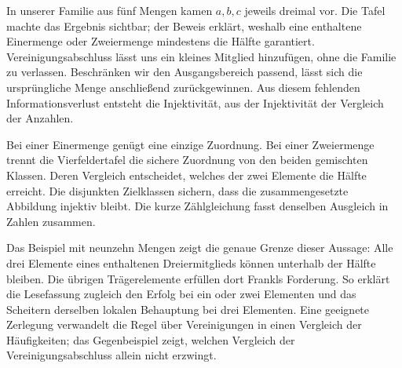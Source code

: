 In unserer Familie aus fünf Mengen kamen \(a,b,c\) jeweils
dreimal vor. Die Tafel machte das Ergebnis sichtbar;
der Beweis erklärt, weshalb eine enthaltene Einermenge
oder Zweiermenge mindestens die Hälfte garantiert.
Vereinigungsabschluss lässt uns ein kleines Mitglied
hinzufügen, ohne die Familie zu verlassen. Beschränken
wir den Ausgangsbereich passend, lässt sich die ursprüngliche
Menge anschließend zurückgewinnen. Aus diesem fehlenden
Informationsverlust entsteht die Injektivität, aus der
Injektivität der Vergleich der Anzahlen.

Bei einer Einermenge genügt eine einzige Zuordnung. Bei
einer Zweiermenge trennt die Vierfeldertafel die sichere
Zuordnung von den beiden gemischten Klassen. Deren Vergleich
entscheidet, welches der zwei Elemente die Hälfte erreicht.
Die disjunkten Zielklassen sichern, dass die zusammengesetzte
Abbildung injektiv bleibt. Die kurze Zählgleichung fasst
denselben Ausgleich in Zahlen zusammen.

Das Beispiel mit neunzehn Mengen zeigt die genaue Grenze
dieser Aussage: Alle drei Elemente eines enthaltenen
Dreiermitglieds können unterhalb der Hälfte bleiben.
Die übrigen Trägerelemente erfüllen dort Frankls Forderung.
So erklärt die Lesefassung zugleich den Erfolg bei ein
oder zwei Elementen und das Scheitern derselben lokalen
Behauptung bei drei Elementen. Eine geeignete Zerlegung
verwandelt die Regel über Vereinigungen in einen Vergleich
der Häufigkeiten; das Gegenbeispiel zeigt, welchen Vergleich
der Vereinigungsabschluss allein nicht erzwingt.
